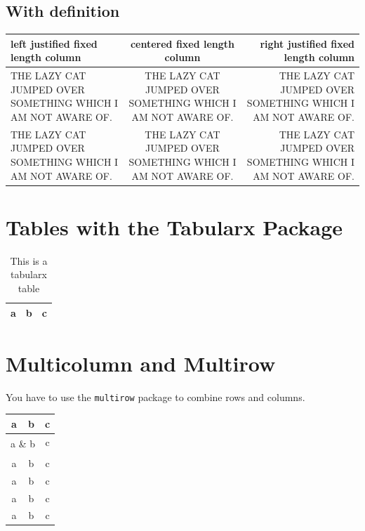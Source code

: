 \documentclass[a4paper,12pt]{article}
\begin{document}
\subsection{With definition}

\begin{center}
    \begin{tabular}{ || L | C | R ||}
        \hline
        left justified fixed length column & centered fixed length column & right justified fixed length column \\
        \hline
        THE LAZY CAT JUMPED OVER SOMETHING WHICH I AM NOT AWARE OF. & THE LAZY CAT JUMPED OVER SOMETHING WHICH I AM NOT AWARE OF. & THE LAZY CAT JUMPED OVER SOMETHING WHICH I AM NOT AWARE OF. \\
        \hline
        THE LAZY CAT JUMPED OVER SOMETHING WHICH I AM NOT AWARE OF. & THE LAZY CAT JUMPED OVER SOMETHING WHICH I AM NOT AWARE OF. & THE LAZY CAT JUMPED OVER SOMETHING WHICH I AM NOT AWARE OF. \\
        \hline
        
        
    \end{tabular}
\end{center}


\section{Tables with the Tabularx Package}

\begin{table}[H]
    \centering
    \begin{tabularx}{.7\textwidth}{ |c|>{\centering\arraybackslash}X|c|}
        \hline
        a & b & c \\
        \hline        
    \end{tabularx}
    \caption{This is a tabularx table}
\end{table}

\section{Multicolumn and Multirow}
You have to use the \verb|multirow| package to combine rows and columns.

\begin{table}[H]
    \centering
    \begin{tabular}{|c|c|c|}
        \hline
        a & b & c \\ \hline 
        \multicolumn{2}{|R|}{\multirow{2}{*}{a \& b}} & c \\ \cline{3-3}
        \multicolumn{3}{|c|}{}  \\ \hline
        a & b & c \\ \hline
        a & b & c \\ \hline
        a & b & c \\ \hline
        a & b & c \\ \hline

    \end{tabular}
    
\end{table}
\end{document}
